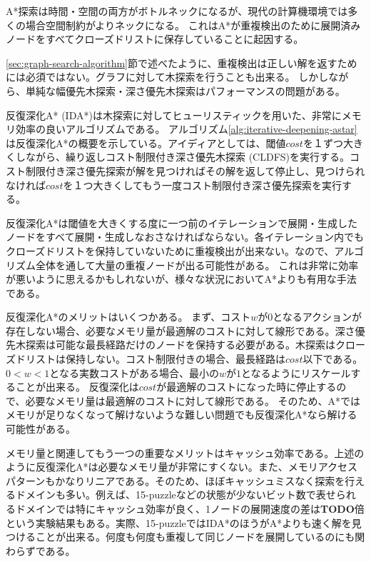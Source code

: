 \documentclass[b5paper]{report}
\newcommand{\TODO}{{\bf TODO}}
\begin{document}
A*探索は時間・空間の両方がボトルネックになるが、現代の計算機環境では多くの場合空間制約がよりネックになる。
これはA*が重複検出のために展開済みノードをすべてクローズドリストに保存していることに起因する。

\ref{sec:graph-search-algorithm}節で述べたように、重複検出は正しい解を返すためには必須ではない。グラフに対して木探索を行うことも出来る。
しかしながら、単純な幅優先木探索・深さ優先木探索はパフォーマンスの問題がある。

反復深化A* (IDA*)は木探索に対してヒューリスティックを用いた、非常にメモリ効率の良いアルゴリズムである\cite{korf:85a}。
アルゴリズム\ref{alg:iterative-deepening-astar}は反復深化A*の概要を示している。アイディアとしては、閾値$cost$を１ずつ大きくしながら、繰り返しコスト制限付き深さ優先木探索 (CLDFS)を実行する。コスト制限付き深さ優先探索が解を見つければその解を返して停止し、見つけられなければ$cost$を１つ大きくしてもう一度コスト制限付き深さ優先探索を実行する。

反復深化A*は閾値を大きくする度に一つ前のイテレーションで展開・生成したノードをすべて展開・生成しなおさなければならない。各イテレーション内でもクローズドリストを保持していないために重複検出が出来ない。なので、アルゴリズム全体を通して大量の重複ノードが出る可能性がある。
これは非常に効率が悪いように思えるかもしれないが、様々な状況においてA*よりも有用な手法である。

反復深化A*のメリットはいくつかある。
まず、コスト$w$が0となるアクションが存在しない場合、必要なメモリ量が最適解のコストに対して線形である。深さ優先木探索は可能な最長経路だけのノードを保持する必要がある。木探索はクローズドリストは保持しない。コスト制限付きの場合、最長経路は$cost$以下である。$0<w<1$となる実数コストがある場合、最小の$w$が$1$となるようにリスケールすることが出来る。 反復深化は$cost$が最適解のコストになった時に停止するので、必要なメモリ量は最適解のコストに対して線形である。
そのため、A*ではメモリが足りなくなって解けないような難しい問題でも反復深化A*なら解ける可能性がある。

メモリ量と関連してもう一つの重要なメリットはキャッシュ効率である。上述のように反復深化A*は必要なメモリ量が非常にすくない。また、メモリアクセスパターンもかなりリニアである。そのため、ほぼキャッシュミスなく探索を行えるドメインも多い。例えば、15-puzzleなどの状態が少ないビット数で表せられるドメインでは特にキャッシュ効率が良く、1ノードの展開速度の差は{\TODO}倍という実験結果もある\cite{korf:85a}。実際、15-puzzleではIDA*のほうがA*よりも速く解を見つけることが出来る\cite{korf:85a}。何度も何度も重複して同じノードを展開しているのにも関わらずである。
\end{document}
